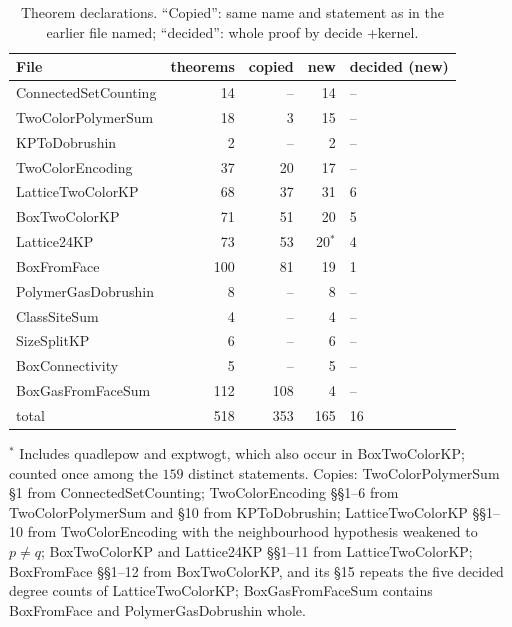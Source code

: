\documentclass[11pt,a4paper]{article}
\theoremstyle{definition}
\theoremstyle{remark}
\DeclareRobustCommand{\lean}[1]{{\ttfamily\renewcommand{\_}{\textunderscore\allowbreak}#1}}
\begin{document}
\begin{table}[ht]\centering\small
\caption{Theorem declarations. ``Copied'': same name and statement as in the earlier file named; ``decided'': whole proof \lean{by decide +kernel}.}\label{tab:count}
\begin{tabular}{@{}lrrrl@{}}\toprule
File & theorems & copied & new & decided (new)\\\midrule
\lean{ConnectedSetCounting} & 14 & -- & 14 & --\\
\lean{TwoColorPolymerSum} & 18 & 3 & 15 & --\\
\lean{KPToDobrushin} & 2 & -- & 2 & --\\
\lean{TwoColorEncoding} & 37 & 20 & 17 & --\\
\lean{LatticeTwoColorKP} & 68 & 37 & 31 & 6\\
\lean{BoxTwoColorKP} & 71 & 51 & 20 & 5\\
\lean{Lattice24KP} & 73 & 53 & 20$^{*}$ & 4\\
\lean{BoxFromFace} & 100 & 81 & 19 & 1\\
\lean{PolymerGasDobrushin} & 8 & -- & 8 & --\\
\lean{ClassSiteSum} & 4 & -- & 4 & --\\
\lean{SizeSplitKP} & 6 & -- & 6 & --\\
\lean{BoxConnectivity} & 5 & -- & 5 & --\\
\lean{BoxGasFromFaceSum} & 112 & 108 & 4 & --\\\midrule
total & 518 & 353 & 165 & 16\\\bottomrule
\end{tabular}
\par\smallskip\raggedright\footnotesize $^{*}$ Includes \lean{quad\_le\_pow} and \lean{exp\_two\_gt}, which also occur in \lean{BoxTwoColorKP}; counted once among the $159$ distinct statements. Copies: \lean{TwoColorPolymerSum} \S1 from \lean{ConnectedSetCounting}; \lean{TwoColorEncoding} \S\S1--6 from \lean{TwoColorPolymerSum} and \S10 from \lean{KPToDobrushin}; \lean{LatticeTwoColorKP} \S\S1--10 from \lean{TwoColorEncoding} with the neighbourhood hypothesis weakened to $p\ne q$; \lean{BoxTwoColorKP} and \lean{Lattice24KP} \S\S1--11 from \lean{LatticeTwoColorKP}; \lean{BoxFromFace} \S\S1--12 from \lean{BoxTwoColorKP}, and its \S15 repeats the five decided degree counts of \lean{LatticeTwoColorKP}; \lean{BoxGasFromFaceSum} contains \lean{BoxFromFace} and \lean{PolymerGasDobrushin} whole.
\end{table}
\end{document}

